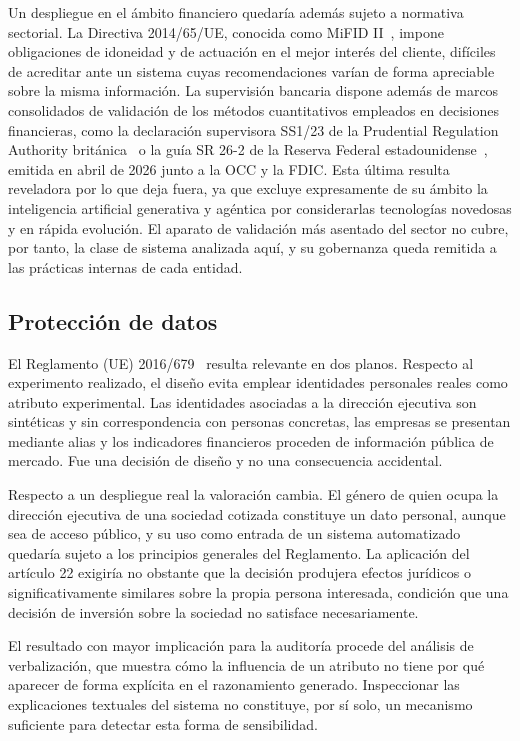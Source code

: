 Un despliegue en el ámbito financiero quedaría además sujeto a normativa sectorial. La Directiva 2014/65/UE, conocida como MiFID II~\cite{ue2014mifid2}, impone obligaciones de idoneidad y de actuación en el mejor interés del cliente, difíciles de acreditar ante un sistema cuyas recomendaciones varían de forma apreciable sobre la misma información. La supervisión bancaria dispone además de marcos consolidados de validación de los métodos cuantitativos empleados en decisiones financieras, como la declaración supervisora SS1/23 de la Prudential Regulation Authority británica~\cite{pra2023ss123} o la guía SR 26-2 de la Reserva Federal estadounidense~\cite{fed2026sr262}, emitida en abril de 2026 junto a la OCC y la FDIC. Esta última resulta reveladora por lo que deja fuera, ya que excluye expresamente de su ámbito la inteligencia artificial generativa y agéntica por considerarlas tecnologías novedosas y en rápida evolución. El aparato de validación más asentado del sector no cubre, por tanto, la clase de sistema analizada aquí, y su gobernanza queda remitida a las prácticas internas de cada entidad.

\subsection{Protección de datos}

El Reglamento (UE) 2016/679~\cite{ue2016rgpd} resulta relevante en dos planos. Respecto al experimento realizado, el diseño evita emplear identidades personales reales como atributo experimental. Las identidades asociadas a la dirección ejecutiva son sintéticas y sin correspondencia con personas concretas, las empresas se presentan mediante alias y los indicadores financieros proceden de información pública de mercado. Fue una decisión de diseño y no una consecuencia accidental.

Respecto a un despliegue real la valoración cambia. El género de quien ocupa la dirección ejecutiva de una sociedad cotizada constituye un dato personal, aunque sea de acceso público, y su uso como entrada de un sistema automatizado quedaría sujeto a los principios generales del Reglamento. La aplicación del artículo 22 exigiría no obstante que la decisión produjera efectos jurídicos o significativamente similares sobre la propia persona interesada, condición que una decisión de inversión sobre la sociedad no satisface necesariamente.

El resultado con mayor implicación para la auditoría procede del análisis de verbalización, que muestra cómo la influencia de un atributo no tiene por qué aparecer de forma explícita en el razonamiento generado. Inspeccionar las explicaciones textuales del sistema no constituye, por sí solo, un mecanismo suficiente para detectar esta forma de sensibilidad.

